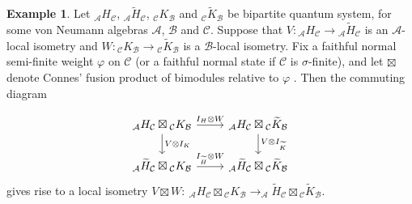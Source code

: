 \documentclass[11pt]{amsart}
\theoremstyle{definition}
\newtheorem{example}[theorem]{Example}
\newcommand{\cl}[1]{\mathcal{#1}}
\newcommand{\ten}{\otimes}
\newcommand{\vphi}{\varphi}
\providecommand{\wt}[1]{\widetilde{#1}}
\begin{document}
\begin{example} 
Let $_\cl{A}H_\cl{C}$, $_\cl{A}\wt{H}_\cl{C}$, $_\cl{C}K_\cl{B}$ and $_\cl{C}\wt{K}_\cl{B}$ be bipartite quantum system, for some
von Neumann algebras $\cl{A}$, $\cl{B}$ and $\cl{C}$. Suppose that  
$V : \mbox{}_\cl{A}H_\cl{C}\to \mbox{}_\cl{A}\wt{H}_\cl{C}$ is an 
$\cl{A}$-local isometry and $W : \mbox{}_\cl{C}K_\cl{B}\to \mbox{}_\cl{C}\wt{K}_\cl{B}$ is a 
$\cl{B}$-local isometry. 
Fix a faithful normal semi-finite weight $\vphi$ on $\cl{C}$ (or a faithful normal state if $\cl{C}$ is $\sigma$-finite), 
and let $\boxtimes$ denote Connes' fusion product of bimodules relative to $\vphi$ \cite[Definition IX.3.16]{takesaki2}.
Then the commuting diagram

\begin{equation*}
\begin{tikzcd}
\mbox{}_\cl{A} H_\cl{C}\boxtimes \mbox{}_\cl{C}K_\cl{B}\arrow[d, "V\ten I_K"] \arrow[r, " I_H\ten W"] 
& \mbox{}_\cl{A} H_\cl{C}\boxtimes \mbox{}_\cl{C}\wt{K}_\cl{B}\arrow[d, "V\ten I_{\wt{K}}"]\\
 \mbox{}_\cl{A}\wt{H}_\cl{C}\boxtimes \mbox{}_\cl{C}K_\cl{B} \arrow[r, " I_{\wt{H}}\ten W"] 
& \mbox{}_\cl{A}\wt{H}_\cl{C}\boxtimes \mbox{}_\cl{C}\wt{K}_\cl{B}
\end{tikzcd}
\end{equation*}
gives rise to a local isometry 
$V\boxtimes W: \ _\cl{A}H_\cl{C}\boxtimes \mbox{}_\cl{C}K_\cl{B}\to _\cl{A}\wt{H}_\cl{C}\boxtimes \mbox{}_\cl{C}\wt{K}_\cl{B}$. 
\end{example}
\end{document}
